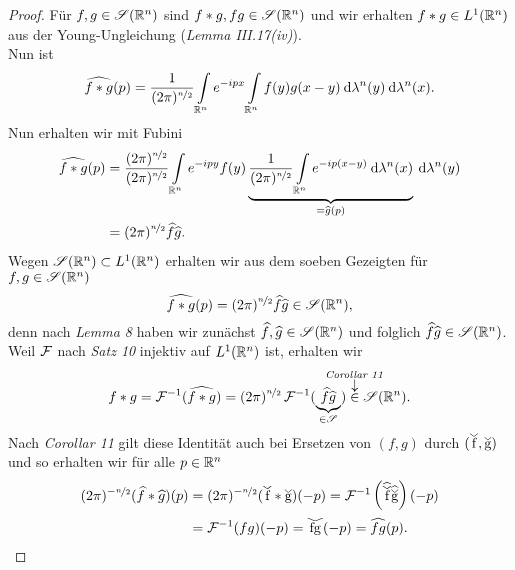 \documentclass[skript.tex]{subfiles}
\begin{document}
	\begin{proof}
		Für $f,g\in\mathscr{S}(\mathbb{R}^n)$ sind $f \ast g, fg \in \mathscr{S}(\mathbb{R}^n)$ und wir erhalten $f \ast g \in L^1(\mathbb{R}^n)$ aus der Young-Ungleichung (\emph{Lemma III.17(iv)}).\\
		Nun ist
		\[
			\widehat{f \ast g}(p) = \frac{1}{(2\pi)^{\nicefrac{n}{2}}} \int\limits_{\mathbb{R}^n} e^{-ipx} \int\limits_{\mathbb{R}^n} f(y)g(x-y) \: \mathrm{d}\lambda^n(y)\: \mathrm{d}\lambda^n(x).
		\]
		Nun erhalten wir mit Fubini
		\begin{align*}
			\widehat{f \ast g}(p) &= \frac{(2\pi)^{\nicefrac{n}{2}}}{(2\pi)^{\nicefrac{n}{2}}} \int\limits_{\mathbb{R}^n} e^{-ipy} f(y) \underbrace{\frac{1}{(2\pi)^{\nicefrac{n}{2}}} \int\limits_{\mathbb{R}^n} e^{-ip(x-y)} \: \mathrm{d}\lambda^n(x)}_{= \widehat{g}(p)}\: \mathrm{d}\lambda^n(y) \\
			 &= (2\pi)^{\nicefrac{n}{2}} \widehat{f}\widehat{g}.
		\end{align*}
		Wegen $\mathscr{S}(\mathbb{R}^n) \subset L^1(\mathbb{R}^n)$ erhalten wir aus dem soeben Gezeigten für $f,g\in\mathscr{S}(\mathbb{R}^n)$
		\[
				\widehat{f \ast g}(p) = (2\pi)^{\nicefrac{n}{2}} \widehat{f}\widehat{g} \in \mathscr{S}(\mathbb{R}^n),
		\]
		denn nach \emph{Lemma 8} haben wir zunächst $\widehat{f},\widehat{g}\in\mathscr{S}(\mathbb{R}^n)$ und folglich $\widehat{f}\widehat{g} \in \mathscr{S}(\mathbb{R}^n)$.\\
		Weil $\mathcal{F}$ nach \emph{Satz 10} injektiv auf $L^1(\mathbb{R}^n)$ ist, erhalten wir
		\[
			f \ast g = \F^{-1}(\wh{f \ast g}) = (2\pi)^{\nicefrac{n}{2}}\, \F^{-1}(\underbrace{\wh{f}\wh{g}}_{\in \ms{S}}) \darrow{\text{\emph{Corollar 11}}}{\in} \ms{S}(\R^n).
		\]
		Nach \emph{Corollar 11} gilt diese Identität auch bei Ersetzen von $(f,g)$ durch $(\wc{f},\wc{g})$ und so erhalten wir für alle $p \in \mathbb{R}^n$
		\begin{align*}
			(2\pi)^{-\nicefrac{n}{2}}(\wh{f}\ast\wh{g})(p) &= (2\pi)^{-\nicefrac{n}{2}}(\wc{f}\ast\wc{g})(-p) = \F^{-1}\left(\wh{\wc{f}}\wh{\wc{g}}\right)(-p)\\
			&= \F^{-1}(fg)(-p) = \wc{fg}(-p) = \wh{fg}(p).
		\end{align*}
	\end{proof}
\end{document}

